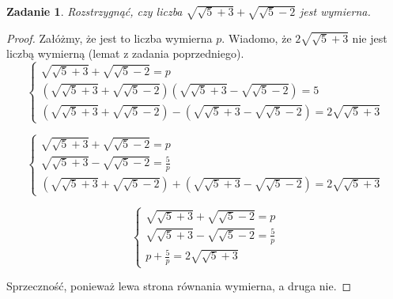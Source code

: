 \documentclass{article}
\newtheorem{problem}{Zadanie}
\begin{document}
\begin{problem}
    Rozstrzygnąć, czy liczba $\sqrt{\sqrt{5} + 3} + \sqrt{\sqrt{5} - 2}$
    jest wymierna.
\end{problem}
\begin{proof}
    Załóżmy, że jest to liczba wymierna $p$.
    Wiadomo, że $2 \sqrt{\sqrt{5} + 3}$ nie jest liczbą wymierną (lemat z zadania poprzedniego).
    $$
    \left\{ \begin{array}{ll}
        \sqrt{\sqrt{5} + 3} + \sqrt{\sqrt{5} - 2} = p\\
        (\sqrt{\sqrt{5} + 3} + \sqrt{\sqrt{5} - 2})(\sqrt{\sqrt{5} + 3}
         - \sqrt{\sqrt{5} - 2}) = 5\\
        (\sqrt{\sqrt{5} + 3} + \sqrt{\sqrt{5} - 2}) -
        (\sqrt{\sqrt{5} + 3} - \sqrt{\sqrt{5} - 2}) = 2 \sqrt{\sqrt{5} + 3}
    \end{array} \right.
    $$

    $$
    \left\{ \begin{array}{ll}
        \sqrt{\sqrt{5} + 3} + \sqrt{\sqrt{5} - 2} = p\\
        \sqrt{\sqrt{5} + 3} - \sqrt{\sqrt{5} - 2} = \frac{5}{p}\\
        (\sqrt{\sqrt{5} + 3} + \sqrt{\sqrt{5} - 2}) +
        (\sqrt{\sqrt{5} + 3} - \sqrt{\sqrt{5} - 2}) = 2 \sqrt{\sqrt{5} + 3}
    \end{array} \right.
    $$

    $$
    \left\{ \begin{array}{ll}
        \sqrt{\sqrt{5} + 3} + \sqrt{\sqrt{5} - 2} = p\\
        \sqrt{\sqrt{5} + 3} - \sqrt{\sqrt{5} - 2} = \frac{5}{p}\\
        p + \frac{5}{p} = 2 \sqrt{\sqrt{5} + 3}
    \end{array} \right.
    $$

    Sprzeczność, ponieważ lewa strona równania wymierna, a druga nie.
\end{proof}
\end{document}
